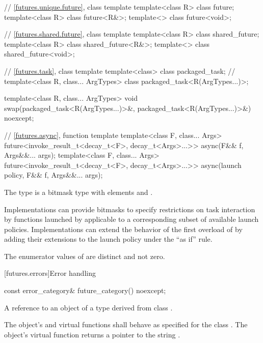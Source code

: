 \begin{codeblock}
{  // \ref{futures.unique.future}, class template 
  template<class R> class future;
  template<class R> class future<R&>;
  template<> class future<void>;

  // \ref{futures.shared.future}, class template 
  template<class R> class shared_future;
  template<class R> class shared_future<R&>;
  template<> class shared_future<void>;

  // \ref{futures.task}, class template 
  template<class> class packaged_task;  // \notdef
  template<class R, class... ArgTypes>
    class packaged_task<R(ArgTypes...)>;

  template<class R, class... ArgTypes>
    void swap(packaged_task<R(ArgTypes...)>&, packaged_task<R(ArgTypes...)>&) noexcept;

  // \ref{futures.async}, function template 
  template<class F, class... Args>
    future<invoke_result_t<decay_t<F>, decay_t<Args>...>>
      async(F&& f, Args&&... args);
  template<class F, class... Args>
    future<invoke_result_t<decay_t<F>, decay_t<Args>...>>
      async(launch policy, F&& f, Args&&... args);
}
\end{codeblock}

\pnum
The  type  is a bitmask type with
elements  and .
\begin{note}
Implementations can provide bitmasks to specify restrictions on task
interaction by functions launched by  applicable to a
corresponding subset of available launch policies. Implementations can extend
the behavior of the first overload of  by adding their extensions
to the launch policy under the ``as if'' rule.
\end{note}

\pnum
The enumerator values of  are distinct and not zero.

[futures.errors]{Error handling}

%
\begin{itemdecl}
const error_category& future_category() noexcept;
\end{itemdecl}

\begin{itemdescr}
\pnum
\returns
A reference to an object of a type derived from class .

\pnum
The object's  and  virtual functions shall
behave as specified for the class . The object's 
virtual function returns a pointer to the string .
\end{itemdescr}

